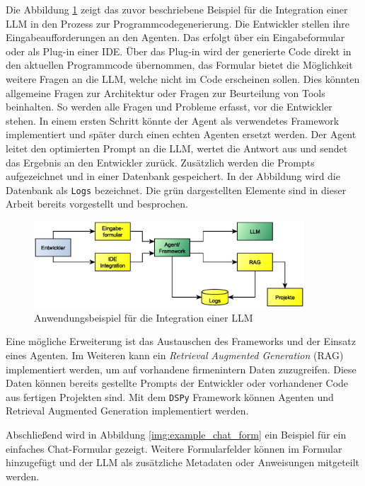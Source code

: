 Die Abbildung \ref{img:example_firm_integration} zeigt das zuvor beschriebene Beispiel für die Integration einer LLM in den Prozess zur Programmcodegenerierung. Die Entwickler stellen ihre Eingabeaufforderungen an den Agenten. Das erfolgt über ein Eingabeformular oder als Plug-in einer IDE. Über das Plug-in wird der generierte Code direkt in den aktuellen Programmcode übernommen, das Formular bietet die Möglichkeit weitere Fragen an die LLM, welche nicht im Code erscheinen sollen. Dies könnten allgemeine Fragen zur Architektur oder Fragen zur Beurteilung von Tools beinhalten. So werden alle Fragen und Probleme erfasst, vor die Entwickler stehen.
In einem ersten Schritt könnte der Agent als verwendetes Framework implementiert und später durch einen echten Agenten ersetzt werden. Der Agent leitet den optimierten Prompt an die LLM, wertet die Antwort aus und sendet das Ergebnis an den Entwickler zurück. Zusätzlich werden die Prompts aufgezeichnet und in einer Datenbank gespeichert. In der Abbildung wird die Datenbank als \texttt{Logs} bezeichnet. Die grün dargestellten Elemente sind in dieser Arbeit bereits vorgestellt und besprochen.\vspace{0.2cm}

\begin{figure}[!ht]
	\includegraphics[width=0.9\textwidth]{content/chapter_discussion/images/anwendungsbeispiel.eps}
	\centering
	\caption{Anwendungsbeispiel für die Integration einer LLM}
	\label{img:example_firm_integration}
\end{figure}

Eine mögliche Erweiterung ist das Austauschen des Frameworks und der Einsatz eines Agenten. Im Weiteren kann ein \textit{Retrieval Augmented Generation} (RAG) implementiert werden, um auf vorhandene firmenintern Daten zuzugreifen. Diese Daten können bereits gestellte Prompts der Entwickler oder vorhandener Code aus fertigen Projekten sind. Mit dem \texttt{DSPy} Framework können Agenten und Retrieval Augmented Generation implementiert werden.\vspace{0.2cm}

Abschließend wird in Abbildung \ref{img:example_chat_form} ein Beispiel für ein einfaches Chat-Formular gezeigt. Weitere Formularfelder können im Formular hinzugefügt und der LLM als zusätzliche Metadaten oder Anweisungen mitgeteilt werden.\vspace{0.2cm}

